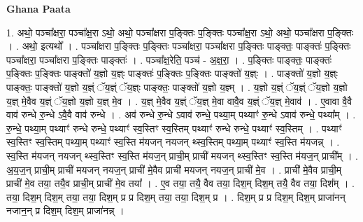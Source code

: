 \documentclass[17pt]{extarticle}
\begin{document}
\textbf{Ghana Paata } \newline

1. अथो॒ पञ्चा᳚क्षरा॒ पञ्चा᳚क्ष॒रा ऽथो॒ अथो॒ पञ्चा᳚क्षरा प॒ङ्क्तिः प॒ङ्क्तिः पञ्चा᳚क्ष॒रा ऽथो॒ अथो॒ पञ्चा᳚क्षरा प॒ङ्क्तिः । . अथो॒ इत्यथो᳚ । . पञ्चा᳚क्षरा प॒ङ्क्तिः प॒ङ्क्तिः पञ्चा᳚क्षरा॒ पञ्चा᳚क्षरा प॒ङ्क्तिः पाङ्क्तः॒ पाङ्क्तः॑ प॒ङ्क्तिः पञ्चा᳚क्षरा॒ पञ्चा᳚क्षरा प॒ङ्क्तिः पाङ्क्तः॑ । . पञ्चा᳚क्ष॒रेति॒ पञ्च॑ - अ॒क्ष॒रा॒ । . प॒ङ्क्तिः पाङ्क्तः॒ पाङ्क्तः॑ प॒ङ्क्तिः प॒ङ्क्तिः पाङ्क्तो॑ य॒ज्ञो य॒ज्ञ्ः पाङ्क्तः॑ प॒ङ्क्तिः प॒ङ्क्तिः पाङ्क्तो॑ य॒ज्ञ्ः । . पाङ्क्तो॑ य॒ज्ञो य॒ज्ञ्ः पाङ्क्तः॒ पाङ्क्तो॑ य॒ज्ञो य॒ज्ञ्ं ॅय॒ज्ञ्ं ॅय॒ज्ञ्ः पाङ्क्तः॒ पाङ्क्तो॑ य॒ज्ञो य॒ज्ञ्म् । . य॒ज्ञो य॒ज्ञ्ं ॅय॒ज्ञ्ं ॅय॒ज्ञो य॒ज्ञो य॒ज्ञ् मे॒वैव य॒ज्ञ्ं ॅय॒ज्ञो य॒ज्ञो य॒ज्ञ् मे॒व । . य॒ज्ञ् मे॒वैव य॒ज्ञ्ं ॅय॒ज्ञ् मे॒वा वावै॒व य॒ज्ञ्ं ॅय॒ज्ञ् मे॒वाव॑ । . ए॒वावा वै॒वै वाव॑ रुन्धे रु॒न्धे ऽवै॒वै वाव॑ रुन्धे । . अव॑ रुन्धे रु॒न्धे ऽवाव॑ रुन्धे॒ पथ्या॒म् पथ्याꣳ॑ रु॒न्धे ऽवाव॑ रुन्धे॒ पथ्या᳚म् । . रु॒न्धे॒ पथ्या॒म् पथ्याꣳ॑ रुन्धे रुन्धे॒ पथ्याꣳ॑ स्व॒स्तिꣳ स्व॒स्तिम् पथ्याꣳ॑ रुन्धे रुन्धे॒ पथ्याꣳ॑ स्व॒स्तिम् । . पथ्याꣳ॑ स्व॒स्तिꣳ स्व॒स्तिम् पथ्या॒म् पथ्याꣳ॑ स्व॒स्ति म॑यजन् नयजन् थ्स्व॒स्तिम् पथ्या॒म् पथ्याꣳ॑ स्व॒स्ति म॑यजन्न् । . स्व॒स्ति म॑यजन् नयजन् थ्स्व॒स्तिꣳ स्व॒स्ति म॑यज॒न् प्राची॒म् प्राची॑ मयजन् थ्स्व॒स्तिꣳ स्व॒स्ति म॑यज॒न् प्राची᳚म् । . अ॒य॒ज॒न् प्राची॒म् प्राची॑ मयजन् नयज॒न् प्राची॑ मे॒वैव प्राची॑ मयजन् नयज॒न् प्राची॑ मे॒व । . प्राची॑ मे॒वैव प्राची॒म् प्राची॑ मे॒व तया॒ तयै॒व प्राची॒म् प्राची॑ मे॒व तया᳚ । . ए॒व तया॒ तयै॒ वैव तया॒ दिश॒म् दिश॒म् तयै॒ वैव तया॒ दिश᳚म् । . तया॒ दिश॒म् दिश॒म् तया॒ तया॒ दिश॒म् प्र प्र दिश॒म् तया॒ तया॒ दिश॒म् प्र । . दिश॒म् प्र प्र दिश॒म् दिश॒म् प्राजा॑नन् नजान॒न् प्र दिश॒म् दिश॒म् प्राजा॑नन्न् । \newline
\end{document}
